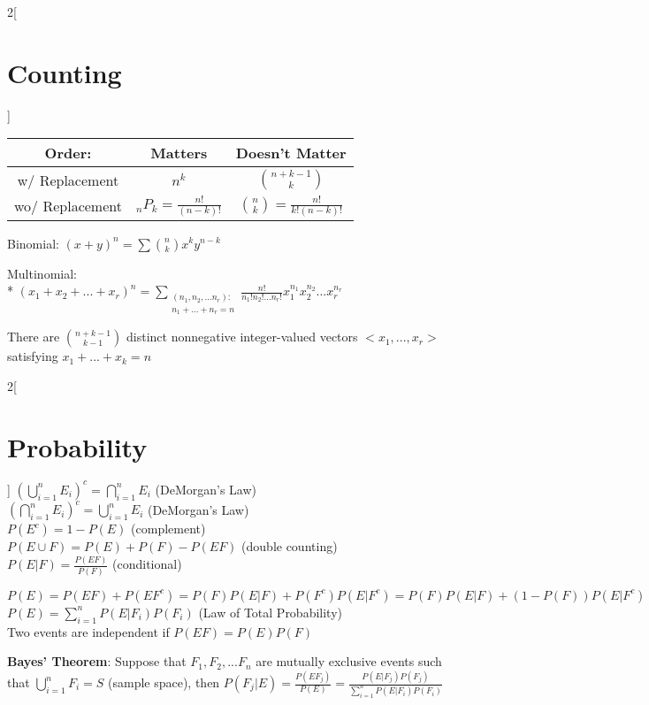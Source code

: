 \documentclass{article}
\begin{document}
	\begin{multicols}{2}[\section*{Counting}]
    \begin{tabular}{|c|c|c|}
     \hline
     Order: & Matters & Doesn't Matter\\ \hline
     w/ Replacement & $n^k$ & $\binom{n+k-1}{k} $ \\ \hline
     wo/ Replacement & ${_nP_k} = \frac{n!}{(n-k)!}$ & $\binom{n}{k} = \frac{n!}{k!(n-k)!}$ \\ \hline
    \end{tabular}
    
    Binomial: $(x+y)^n = \sum{\binom{n}{k}x^ky^{n-k}}$
    
    Multinomial:\\*
    $(x_1 + x_2 + ... + x_r)^n = \sum\limits_{\substack{(n_1, n_2, ... n_r): \\ n_1 + ... + n_r = n}} \frac{n!}{n_1!n_2!...n_r!}x_1^{n_1}x_2^{n_2}...x_r^{n_r}$
    
	There are $\binom{n+k-1}{k-1}$ distinct nonnegative integer-valued vectors $<x_1,..., x_r>$ satisfying $x_1 + ... + x_k = n$
    \end{multicols}
  	\vspace{-2em}
	\begin{multicols}{2}[\section*{Probability}]
	$\left(\bigcup_{i=1}^{n} E_i\right)^c = \bigcap_{i=1}^{n} E_i$ (DeMorgan's Law) \\
    $\left(\bigcap_{i=1}^{n} E_i\right)^c = \bigcup_{i=1}^{n} E_i$ (DeMorgan's Law) \\
    $P(E^c) = 1 - P(E)$ (complement)\\
    $P(E \cup F) = P(E) + P(F) - P(EF)$ (double counting)\\
    $P(E \vert F) = \frac{P(EF)}{P(F)}$ (conditional)
    
    $P(E) = P(EF) + P(EF^c) = P(F)P(E \vert F) + P(F^c)P(E \vert F^c) = P(F)P(E \vert F) + (1 - P(F))P(E \vert F^c)$\\
    $P(E) = \sum_{i=1}^n P(E \vert F_i)P(F_i)$ (Law of Total Probability)\\
    Two events are independent if $P(EF) = P(E)P(F)$
    
    \textbf{Bayes' Theorem}: Suppose that $F_1, F_2, ... F_n$ are mutually exclusive events such that $\bigcup_{i=1}^n F_i = S$ (sample space), then $P(F_j \vert E) = \frac{P(EF_j)}{P(E)} = \frac{P(E \vert F_j)P(F_j)}{\sum_{i=1}^n P(E \vert F_i)P(F_i)}$
    
    \end{multicols}
	\vspace{-2em}
\end{document}

